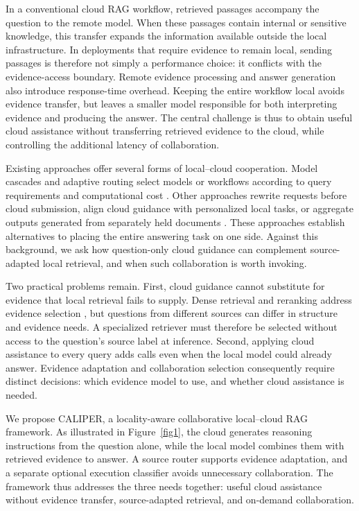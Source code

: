 \documentclass[a4paper,fleqn]{cas-dc}
\begin{document}
In a conventional cloud RAG workflow, retrieved passages accompany the question to the remote model. When these passages contain internal or sensitive knowledge, this transfer expands the information available outside the local infrastructure. In deployments that require evidence to remain local, sending passages is therefore not simply a performance choice: it conflicts with the evidence-access boundary. Remote evidence processing and answer generation also introduce response-time overhead. Keeping the entire workflow local avoids evidence transfer, but leaves a smaller model responsible for both interpreting evidence and producing the answer. The central challenge is thus to obtain useful cloud assistance without transferring retrieved evidence to the cloud, while controlling the additional latency of collaboration.

Existing approaches offer several forms of local--cloud cooperation. Model cascades and adaptive routing select models or workflows according to query requirements and computational cost \cite{chen2023frugalgpt,ong2025routellm,jeong2024adaptive}. Other approaches rewrite requests before cloud submission, align cloud guidance with personalized local tasks, or aggregate outputs generated from separately held documents \cite{siyan2025papillon,zhang2025lsrp,liu2025dragon}. These approaches establish alternatives to placing the entire answering task on one side. Against this background, we ask how question-only cloud guidance can complement source-adapted local retrieval, and when such collaboration is worth invoking.

Two practical problems remain. First, cloud guidance cannot substitute for evidence that local retrieval fails to supply. Dense retrieval and reranking address evidence selection \cite{xiao2024c,nogueira2019passage}, but questions from different sources can differ in structure and evidence needs. A specialized retriever must therefore be selected without access to the question's source label at inference. Second, applying cloud assistance to every query adds calls even when the local model could already answer. Evidence adaptation and collaboration selection consequently require distinct decisions: which evidence model to use, and whether cloud assistance is needed.

We propose CALIPER, a locality-aware collaborative local--cloud RAG framework. As illustrated in Figure~\ref{fig1}, the cloud generates reasoning instructions from the question alone, while the local model combines them with retrieved evidence to answer. A source router supports evidence adaptation, and a separate optional execution classifier avoids unnecessary collaboration. The framework thus addresses the three needs together: useful cloud assistance without evidence transfer, source-adapted retrieval, and on-demand collaboration.
\end{document}
